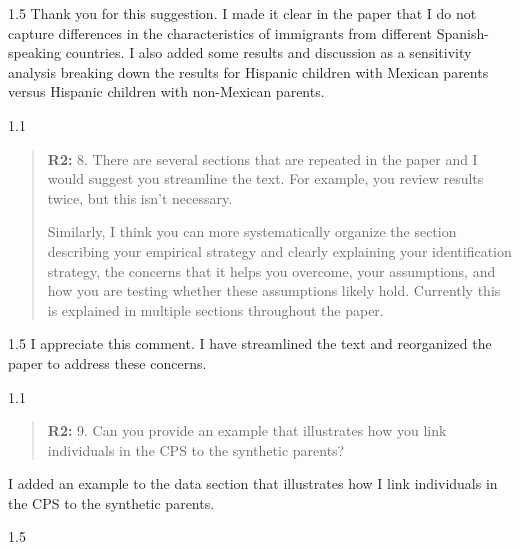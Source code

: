 \documentclass[12pt,english]{article}
\newcommand{\rrquote}{1.1}
\newcommand{\rrxspc}{1.5}
\begin{document}
\begin{refsection}
        \begin{spacing}{\rrxspc}
            Thank you for this suggestion. I made it clear in the paper that I do not capture differences in the characteristics of immigrants from different Spanish-speaking countries. I also added some results and discussion as a sensitivity analysis breaking down the results for Hispanic children with Mexican parents versus Hispanic children with non-Mexican parents. 
    \end{spacing}

    \begin{spacing}{\rrquote}
        \begin{quotation}
        \textbf{R2: } 8. There are several sections that are repeated in the paper and I would suggest you streamline the text. For example, you review results twice, but this isn’t necessary.

        Similarly, I think you can more systematically organize the section describing your empirical strategy and clearly explaining your identification strategy, the concerns that it helps you overcome, your assumptions, and how you are testing whether these assumptions likely hold. Currently this is explained in multiple sections throughout the paper.        
        \end{quotation}
        \end{spacing}
        
        \begin{spacing}{\rrxspc}
            I appreciate this comment. I have streamlined the text and reorganized the paper to address these concerns. 
    \end{spacing}

    \begin{spacing}{\rrquote}
        \begin{quotation}
        \textbf{R2: } 9. Can you provide an example that illustrates how you link individuals in the CPS to the synthetic parents?
              
        \end{quotation}
        \end{spacing}
            I added an example to the data section that illustrates how I link individuals in the CPS to the synthetic parents.
        \begin{spacing}{\rrxspc}
            
    \end{spacing}


\end{refsection}
\end{document}
